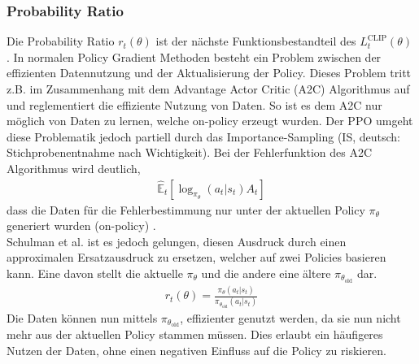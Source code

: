 \subsubsection{Probability Ratio} \label{subsubsec:Grundlagen_Probability_Ratio}
Die Probability Ratio $r_{t}(\theta)$ ist der nächste Funktionsbestandteil des $L^\text{CLIP}_{t} (\theta)$ .
In normalen Policy Gradient Methoden besteht ein Problem zwischen der effizienten Datennutzung und der Aktualisierung der Policy. Dieses Problem tritt z.B. im Zusammenhang mit dem Advantage Actor Critic (A2C) Algorithmus auf und reglementiert die effiziente Nutzung von Daten. 
So ist es dem A2C nur möglich von Daten zu lernen, welche on-policy  erzeugt wurden.
Der PPO umgeht diese Problematik jedoch partiell durch das Importance-Sampling (IS, deutsch: Stichprobenentnahme nach Wichtigkeit).
Bei der Fehlerfunktion des A2C Algorithmus  wird deutlich,
\begin{align}
	\label{eq:Grundlagen_A2C_Loss}
	\mathbb{\hat{E}}_t[\log_{\pi_{\theta}}(a_t|s_t)A_t]
\end{align}
dass die Daten für die Fehlerbestimmung nur unter der aktuellen Policy $\pi_{\theta}$ generiert wurden (on-policy) \citep[S. 591]{DRL_Lapan}.\\
Schulman et al. ist es jedoch gelungen, diesen Ausdruck durch einen approximalen Ersatzausdruck zu ersetzen, welcher auf zwei Policies basieren kann. Eine davon stellt die aktuelle $\pi_{\theta}$ und die andere eine ältere $\pi_{\theta_{\text{old}}}$ dar.
\begin{align}
	\label{eq:Grundlagen_Probability_Ratio}
	r_{t}(\theta) = \frac{\pi_{\theta}(a_{t}|s_{t})}{\pi_{\theta_{\text{old}}}(a_{t}|s_{t})}
\end{align}
Die Daten können nun mittels $\pi_{\theta_{\text{old}}}$, effizienter genutzt werden, da sie nun nicht mehr aus der aktuellen Policy stammen müssen. Dies erlaubt ein häufigeres Nutzen der Daten, ohne einen negativen Einfluss auf die Policy zu riskieren. \citep[Zeitpunkt: 9:25]{Deep_RL_Bootcamp}

